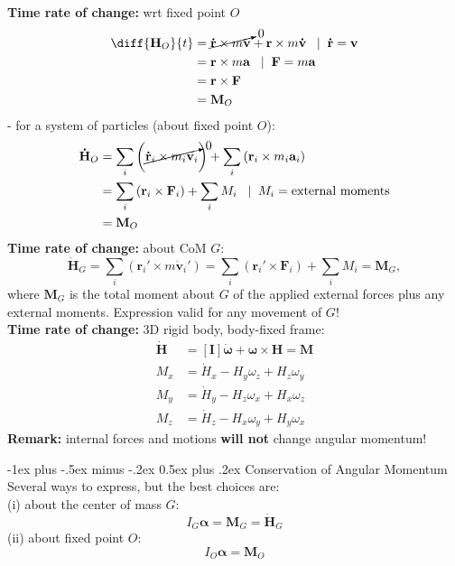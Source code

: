 \documentclass[10pt,landscape]{article}
\makeatletter
\renewcommand{\section}{\@startsection{section}{1}{0mm}%
                                {-1ex plus -.5ex minus -.2ex}%
                                {0.5ex plus .2ex}%
                                {\normalfont\large\bfseries}}
\makeatother
\begin{document}
\begin{multicols}{3}
    {\bf Time rate of change:} wrt fixed point $O$
    \begin{align*}
        \diff{\mathbf{H}_O}{t} &= \cancelto{0}{\mathbf{\dot{r}} \times m\mathbf{v}} + 
        \mathbf{r} \times m\mathbf{\dot{v}}\;\;\; | \;\; \mathbf{\dot{r}} = \mathbf{v}    \\
        &= \mathbf{r} \times m\mathbf{a}\;\;\; | \;\; \mathbf{F} = m\mathbf{a}    \\
        &= \mathbf{r} \times \mathbf{F} \\
        &= \mathbf{M}_O
    \end{align*}
    - for a system of particles (about fixed point $O$):
    \begin{align*}
        \mathbf{\dot{H}}_O &= \sum_i \left( \cancelto{0}{\mathbf{\dot{r}}_i \times m_i \mathbf{v}_i} \right) + 
            \sum_i \left( \mathbf{{r}}_i \times m_i \mathbf{a}_i \right) \\
        &= \sum_i \left( \mathbf{{r}}_i \times \mathbf{F}_i \right) + \sum_i M_i \;\;\; | \;\; M_i 
            = \text{external moments} \\
        &= \mathbf{M}_O
    \end{align*}
    {\bf Time rate of change:} about CoM $G$:
    \[\mathbf{\dot{H}}_G = \sum_i \left( \mathbf{r}_i' \times m \mathbf{\dot{v}}_i' \right) = 
        \sum_i \left( \mathbf{r}_i' \times \mathbf{F}_i \right) + \sum_i M_i = \mathbf{M}_G,\]
    where $\mathbf{M}_G$ is the total moment about $G$ of the applied external
    forces plus any external moments. Expression valid for any movement of $G$! \\
    {\bf Time rate of change:} 3D rigid body, body-fixed frame:
    \begin{align*}
        \mathbf{\dot{H}} &= [\mathbf{I}]\boldsymbol{\dot{\omega}} + \boldsymbol{\omega} \times \mathbf{H} = \mathbf{M} \\
        M_x &= \dot{H}_x - H_y\omega_z + H_z \omega_y \\
        M_y &= \dot{H}_y - H_z\omega_x + H_x \omega_z \\
        M_z &= \dot{H}_z - H_x\omega_y + H_y \omega_x 
    \end{align*}
    {\bf Remark:} internal forces and motions {\bf will not } change angular momentum!


\section{Conservation of Angular Momentum}
    Several ways to express, but the best choices are:\\
    (i) about the center of mass $G$:
    \[ I_G \boldsymbol{\alpha} = \mathbf{M}_G = \mathbf{\dot{H}}_G \]
    (ii) about fixed point $O$:
    \[ I_O \boldsymbol{\alpha} = \mathbf{M}_O \]



\end{multicols}
\end{document}
